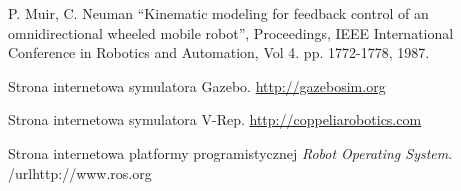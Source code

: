 \begin{thebibliography}{0}

 P. Muir, C. Neuman “Kinematic modeling for feedback control of an
omnidirectional wheeled mobile robot”, Proceedings, IEEE International
Conference in Robotics and Automation, Vol 4. pp. 1772-1778, 1987.

Strona internetowa symulatora Gazebo.
\url{http://gazebosim.org}

Strona internetowa symulatora V-Rep.
\url{http://coppeliarobotics.com}

Strona internetowa platformy programistycznej \emph{Robot Operating System}.
/url{http://www.ros.org}

\end{thebibliography}